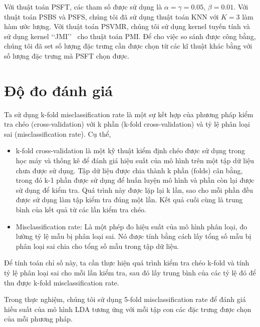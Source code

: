 Với thuật toán PSFT, các tham số được sử dụng là $\alpha=\gamma=0.05$, $\beta=0.01$. Với thuật toán PSBS và PSFS, chúng tôi đã sử dụng thuật toán KNN với $K=3$ làm hàm ước lượng. Với thuật toán PSVMR, chúng tôi sử dụng kernel tuyến tính và sử dụng kernel \lq\lq JMI\rq\rq~ cho thuật toán PMI. Để cho việc so sánh được công bằng, chúng tôi đã set số lượng đặc trưng cần được chọn từ các kĩ thuật khác bằng với số lượng đặc trưng mà PSFT chọn được.

\section{Độ đo đánh giá}
Ta sử dụng k-fold misclassification rate là một sự kết hợp của phương pháp kiểm tra chéo (cross-validation) với k phần (k-fold cross-validation) và tỷ lệ phân loại sai (misclassification rate). Cụ thể,
\begin{itemize}
	\item k-fold cross-validation là một kỹ thuật kiểm định chéo được sử dụng trong học máy và thống kê để đánh giá hiệu suất của mô hình trên một tập dữ liệu chưa được sử dụng. Tập dữ liệu được chia thành k phần (folds) cân bằng, trong đó k-1 phần được sử dụng để huấn luyện mô hình và phần còn lại được sử dụng để kiểm tra. Quá trình này được lặp lại k lần, sao cho mỗi phần đều được sử dụng làm tập kiểm tra đúng một lần. Kết quả cuối cùng là trung bình của kết quả từ các lần kiểm tra chéo.
	\item Misclassification rate: Là một phép đo hiệu suất của mô hình phân loại, đo lường tỷ lệ mẫu bị phân loại sai. Nó được tính bằng cách lấy tổng số mẫu bị phân loại sai chia cho tổng số mẫu trong tập dữ liệu.
\end{itemize}

Để tính toán chỉ số này, ta cần thực hiện quá trình kiểm tra chéo k-fold và tính tỷ lệ phân loại sai cho mỗi lần kiểm tra, sau đó lấy trung bình của các tỷ lệ đó để thu được k-fold misclassification rate.

Trong thực nghiệm, chúng tôi sử dụng 5-fold misclassification rate để đánh giá hiếu suất của mô hình LDA tương ứng với mỗi tập con các đặc trưng được chọn của mỗi phương pháp.

